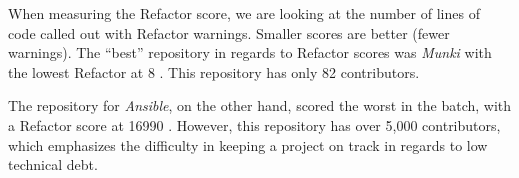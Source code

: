 When measuring the Refactor score, we are looking at the number of lines of code called out with Refactor warnings. Smaller scores are better (fewer warnings). The ``best'' repository in regards to Refactor scores was \emph{Munki} with the lowest Refactor at 8 \cite{data:munki}. This repository has only 82 contributors.

The repository for \emph{Ansible}, on the other hand, scored the worst in the batch, with a Refactor score at 16990 \cite{data:ansible}. However, this repository has over 5,000 contributors, which emphasizes the difficulty in keeping a project on track in regards to low technical debt.


